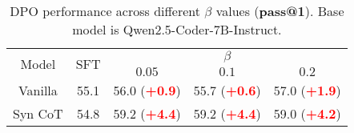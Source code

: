 \begin{table}[h!]
    \centering
\begin{adjustbox}{max width=\columnwidth}
    \begin{tabular}{c | c | c c c }
    \toprule
    \multirow{2}{*}{Model} & \multirow{2}{*}{SFT} & \multicolumn{3}{c}{\textbf{$\beta$}} \\
    & & $0.05$ & $0.1$ & $0.2$ \\
    \midrule
    Vanilla & 55.1 & 56.0 (\textbf{\textcolor{red}{+0.9}}) & 55.7 (\textbf{\textcolor{red}{+0.6}})& 57.0 (\textbf{\textcolor{red}{+1.9}}) \\
    Syn CoT & 54.8 & 59.2 (\textbf{\textcolor{red}{+4.4}}) & 59.2 (\textbf{\textcolor{red}{+4.4}}) & 59.0 (\textbf{\textcolor{red}{+4.2}})\\
    \bottomrule
    \end{tabular}
\end{adjustbox}
\caption{DPO performance across different $\beta$ values (\textbf{pass@1}). Base model is Qwen2.5-Coder-7B-Instruct.}
\end{table}